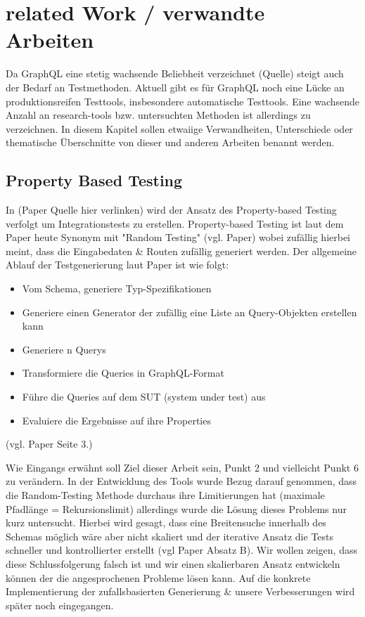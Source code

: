 \chapter{related Work / verwandte Arbeiten}

Da GraphQL eine stetig wachsende Beliebheit verzeichnet (Quelle) steigt auch der Bedarf an Testmethoden. Aktuell gibt es
für GraphQL noch eine Lücke an produktionsreifen Testtools, insbesondere automatische Testtools.
Eine wachsende Anzahl an research-tools bzw. untersuchten Methoden ist allerdings zu verzeichnen.
In diesem Kapitel sollen etwaiige Verwandheiten, Unterschiede oder thematische Überschnitte von dieser und anderen Arbeiten benannt werden.


\section{Property Based Testing}

In (Paper Quelle hier verlinken) wird der Ansatz des Property-based Testing verfolgt um Integrationstests zu erstellen.
Property-based Testing ist laut dem Paper heute Synonym mit "Random Testing" (vgl. Paper) wobei zufällig hierbei meint,
dass die Eingabedaten & Routen zufällig generiert werden.
Der allgemeine Ablauf der Testgenerierung laut Paper ist wie folgt:

\begin{center}
    \begin{itemize}
        \item[1.] Vom Schema, generiere Typ-Spezifikationen
        \item[2.] Generiere einen Generator der zufällig eine Liste an Query-Objekten erstellen kann
        \item[3.] Generiere n Querys
        \item[4.] Transformiere die Queries in GraphQL-Format
        \item[5.] Führe die Queries auf dem SUT (system under test) aus
        \item[6.] Evaluiere die Ergebnisse auf ihre Properties
    \end{itemize} (vgl. Paper Seite 3.)
\end{center}

Wie Eingangs erwähnt soll Ziel dieser Arbeit sein, Punkt 2 und vielleicht Punkt 6 zu verändern.
In der Entwicklung des Tools wurde Bezug darauf genommen, dass die Random-Testing Methode durchaus ihre Limitierungen hat (maximale Pfadlänge = Rekursionslimit) allerdings
wurde die Lösung dieses Problems nur kurz untersucht. Hierbei wird gesagt, dass eine Breitensuche innerhalb des Schemas
möglich wäre aber nicht skaliert und der iterative Ansatz die Tests schneller und kontrollierter erstellt (vgl Paper Absatz B).
Wir wollen zeigen, dass diese Schlussfolgerung falsch ist und wir einen skalierbaren Ansatz entwickeln können der die angesprochenen
Probleme lösen kann.
Auf die konkrete Implementierung der zufallsbasierten Generierung & unsere Verbesserungen wird später noch eingegangen.

